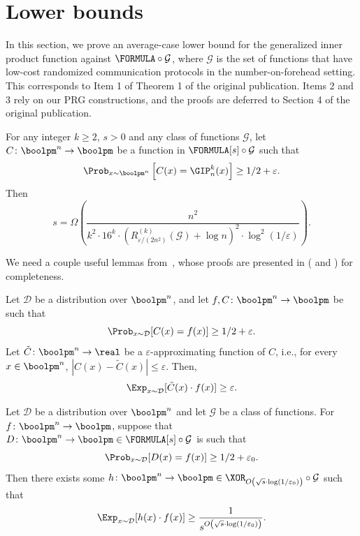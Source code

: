 \setcounter{theorem}{18}
	\section{Lower bounds}\label{sec:lower-bounds}
	
	In this section, we prove an average-case lower bound for the generalized inner product function against $\FORMULA\circ\mathcal{G}$, where $\mathcal{G}$ is the set of functions that have low-cost randomized communication protocols in the number-on-forehead setting. This corresponds to Item 1 of Theorem 1 of the original publication. Items 2 and 3 rely on our PRG constructions, and the proofs are deferred to Section 4 of the original publication.
	
	\begin{theorem}\label{thm:lb-main}
		For any integer $k\geq 2$, $s>0$ and any class of functions $\mathcal{G}$, let $C\colon\boolpm^{n}\to\boolpm$ be a function in $\FORMULA[s]\circ\mathcal{G}$ such that
		\[
		    \Prob_{x\sim\boolpm^{n}}\left[C(x)=\GIP_{n}^{k}(x)\right]\geq 1/2+\varepsilon.
		\]
		Then
		\[
	  		s = \Omega\left( \frac{n^2}{k^2\cdot16^{k}\cdot\left(R^{(k)}_{\varepsilon/(2n^2)}(\mathcal{G})+\log n\right)^2\cdot\log^2(1/\varepsilon)}\right).
		\]
	\end{theorem}
	
	We need a couple useful lemmas from~\cite{Tal16}, whose proofs are presented in  ( and ) for completeness.
	
	\begin{lemma}\label{lem:lb-Tal-1}
	    Let $\mathcal{D}$ be a distribution over $\boolpm^n$, and let $f,C\colon\boolpm^n\to\boolpm$ be such that
	    \[
	        \Prob_{x\sim\mathcal{D}}[C(x)=f(x)]\geq 1/2+\varepsilon.
	    \] 
	    Let $\tilde{C}\colon\boolpm^n\to\real$ be a $\varepsilon$-approximating function of $C$, i.e., for every $x\in\boolpm^n$, $|C(x)-\tilde{C}(x)|\leq \varepsilon$. Then,
	    \[
	        \Exp_{x\sim\mathcal{D}}[\tilde{C}(x)\cdot f(x)]\geq \varepsilon.
	    \]
	\end{lemma}
	
	\begin{lemma}\label{lem:lb-Tal-2}
	    Let $\mathcal{D}$ be a distribution over $\boolpm^n$ and let $\mathcal{G}$ be a class of functions. For $f\colon\boolpm^n\to\boolpm$, suppose that $D\colon\boolpm^n\to\boolpm\in \FORMULA[s]\circ\mathcal{G}$ is such that 
	    \[
	        \Prob_{x\sim\mathcal{D}}[D(x)=f(x)]\geq 1/2+\varepsilon_0.
	    \]
	    Then there exists some $h\colon\boolpm^n\to\boolpm\in \XOR_{O\left(\sqrt{s}\cdot\log(1/\varepsilon_0)\right)}\circ \mathcal{G}$ such that
	    \[
	        \Exp_{x\sim\mathcal{D}}[h(x)\cdot f(x)]\geq \frac{1}{s^{O\left(\sqrt{s}\cdot\log(1/\varepsilon_0)\right)}}.
	    \]
	\end{lemma}
    
